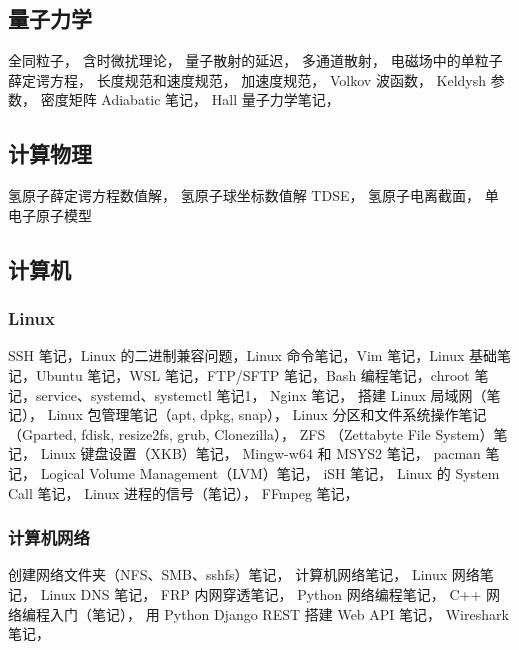 \subsection{量子力学}
全同粒子， 含时微扰理论， 量子散射的延迟， 多通道散射， 电磁场中的单粒子薛定谔方程， 长度规范和速度规范， 加速度规范， Volkov 波函数， Keldysh 参数， 密度矩阵
Adiabatic 笔记，
Hall 量子力学笔记，

\subsection{计算物理}
氢原子薛定谔方程数值解， 氢原子球坐标数值解 TDSE， 氢原子电离截面，  单电子原子模型

\subsection{计算机}
\subsubsection{Linux}
SSH 笔记，Linux 的二进制兼容问题，Linux 命令笔记，Vim 笔记，Linux 基础笔记，Ubuntu 笔记，WSL 笔记，FTP/SFTP 笔记，Bash 编程笔记，chroot 笔记，service、systemd、systemctl 笔记1，%
Nginx 笔记，
搭建 Linux 局域网（笔记），
Linux 包管理笔记（apt, dpkg, snap），
Linux 分区和文件系统操作笔记（Gparted, fdisk, resize2fs, grub, Clonezilla），
ZFS （Zettabyte File System）笔记，
Linux 键盘设置（XKB）笔记，
Mingw-w64 和 MSYS2 笔记，
pacman 笔记，
Logical Volume Management（LVM）笔记，
iSH 笔记，
Linux 的 System Call 笔记，
Linux 进程的信号（笔记），
FFmpeg 笔记，

\subsubsection{计算机网络}
创建网络文件夹（NFS、SMB、sshfs）笔记，
计算机网络笔记，
Linux 网络笔记，
Linux DNS 笔记，
FRP 内网穿透笔记，
Python 网络编程笔记，
C++ 网络编程入门（笔记），
用 Python Django REST 搭建 Web API 笔记，
Wireshark 笔记，

